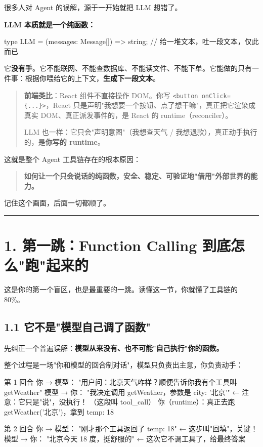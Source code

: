 很多人对 Agent 的误解，源于一开始就把 LLM 想错了。

\textbf{LLM 本质就是一个纯函数：}

\begin{codeblock}
type LLM = (messages: Message[]) => string;   // 给一堆文本，吐一段文本，仅此而已
\end{codeblock}

它\textbf{没有手}。它不能联网、不能查数据库、不能读文件、不能下单。它能做的只有一件事：根据你喂给它的上下文，\textbf{生成下一段文本}。

\begin{quote}
 \textbf{前端类比}：React 组件不直接操作 DOM。你写 \texttt{<button onClick=\{...\}>}，React 只是声明"我想要一个按钮、点了想干嘛"，真正把它渲染成真实 DOM、真正派发事件的，是 React 的 runtime（reconciler）。

LLM 也一样：它只会"声明意图"（我想查天气 / 我想退款），真正动手执行的，是\textbf{你写的 runtime}。
\end{quote}

这就是整个 Agent 工具链存在的根本原因：

\begin{quote}
\textbf{如何让一个只会说话的纯函数，安全、稳定、可验证地"借用"外部世界的能力。}
\end{quote}

记住这个画面，后面一切都顺了。

\bigskip\hrule\bigskip

\section{1. 第一跳：Function Calling 到底怎么"跑"起来的}

这是你的第一个盲区，也是最重要的一跳。读懂这一节，你就懂了工具链的 80\%。

\subsection{1.1 它不是"模型自己调了函数"}

先纠正一个普遍误解：\textbf{模型从来没有、也不可能"自己执行"你的函数。}

整个过程是一场"你和模型的回合制对话"，模型只负责出主意，你负责动手：

\begin{codeblock}
第 1 回合
  你 → 模型：  "用户问：北京天气咋样？顺便告诉你我有个工具叫 getWeather"
  模型 → 你：  "我决定调用 getWeather，参数是 {city: '北京'}"   ← 注意：它只是"说"，没执行！
                                                              （这段叫 tool_call）
  你（runtime）：真正去跑 getWeather('北京')，拿到 {temp: 18}

第 2 回合
  你 → 模型：  "刚才那个工具返回了 {temp: 18}"                  ← 这步叫"回填"，关键！
  模型 → 你：  "北京今天 18 度，挺舒服的"                       ← 这次它不调工具了，给最终答案
\end{codeblock}

